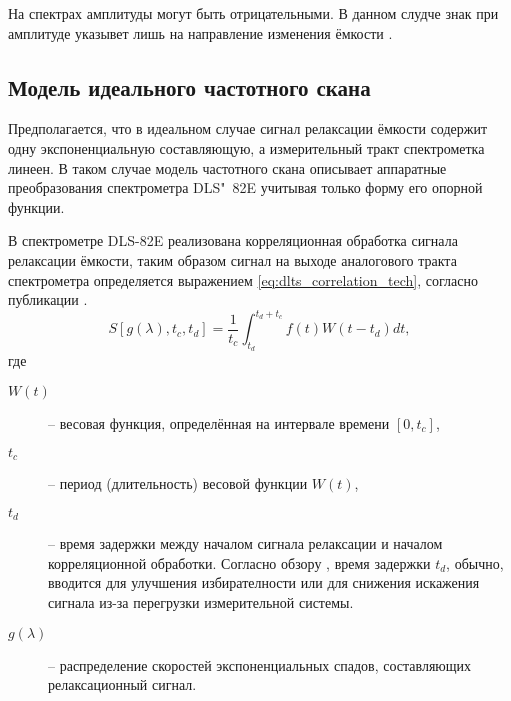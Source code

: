     На спектрах амплитуды могут быть отрицательными. В данном слудче знак при
    амплитуде указывет лишь на направление изменения ёмкости \cite{rp_vak}.


    \subsection{Модель идеального частотного скана}
    Предполагается, что в идеальном случае сигнал релаксации ёмкости содержит 
    одну экспоненциальную составляющую, а измерительный тракт спектрометка
    линеен. В таком случае модель частотного скана описывает аппаратные 
    преобразования спектрометра DLS"~82E учитывая только форму его опорной
    функции.

    В спектрометре DLS-82E реализована корреляционная обработка сигнала
    релаксации ёмкости, таким образом сигнал на выходе аналогового тракта
    спектрометра определяется выражением \ref{eq:dlts_correlation_tech},
    согласно публикации \cite{istratov_exp_analysis}.
    \begin{equation}
        \label{eq:dlts_correlation_tech}
        S\left[g(\lambda),t_c,t_d\right]=\frac{1}{t_c}\int_{t_d}^{t_d+t_c}
        f(t)W\left(t-t_d\right)dt ,
    \end{equation}
    где
    \begin{description}
        \item[$W(t)$] -- весовая функция, определённая на интервале 
        времени $\left[0,t_c\right]$,
        \item[$t_c$] -- период (длительность) весовой функции $W(t)$,
        \item[$t_d$] -- время задержки между началом сигнала релаксации
        и началом корреляционной обработки. Согласно обзору 
        \cite{istratov_exp_analysis}, время задержки $t_d$, обычно, 
        вводится для улучшения избирателности или для снижения искажения
        сигнала из-за перегрузки измерительной системы.
        \item[$g(\lambda)$] -- распределение скоростей экспоненциальных
        спадов, составляющих релаксационный сигнал.
    \end{description}

